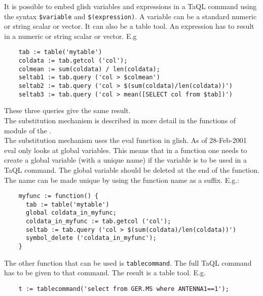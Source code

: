 \begin{itemize}
  It is possible to embed glish variables and expressions in a TaQL
  command using the syntax \texttt{\$variable} and
  \texttt{\$(expression)}. A variable can be a standard numeric or
  string scalar or vector. It can also be a table tool.
  An expression has to result in a numeric or string scalar or vector.
  E.g
  \begin{verbatim}
    tab := table('mytable')
    coldata := tab.getcol ('col');
    colmean := sum(coldata) / len(coldata);
    seltab1 := tab.query ('col > $colmean')
    seltab2 := tab.query ('col > $(sum(coldata)/len(coldata))')
    seltab3 := tab.query ('col > mean([SELECT col from $tab])')
  \end{verbatim}
  These three queries give the same result.
  \\The substitution mechanism is described in more detail in the
  functions of module
   of the
  .
  \\The substitution mechanism uses the eval function in glish.
  As of 28-Feb-2001 eval only looks at global variables. This means
  that in a function one needs to create a global variable (with
  a unique name) if the variable is to be used in a TaQL command.
  The global variable should be deleted at the end of the function.
  The name can be made unique by using the function name as a suffix.
  E.g.:
  \begin{verbatim}
    myfunc := function() {
      tab := table('mytable')
      global coldata_in_myfunc;
      coldata_in_myfunc := tab.getcol ('col');
      seltab := tab.query ('col > $(sum(coldata)/len(coldata))')
      symbol_delete ('coldata_in_myfunc');
    }
  \end{verbatim}

  The other function that can be used is \texttt{tablecommand}. The
  full TaQL command has to be given to that command. The result is
  a table tool. E.g.
  \begin{verbatim}
    t := tablecommand('select from GER.MS where ANTENNA1==1');
  \end{verbatim}  


\end{itemize}
